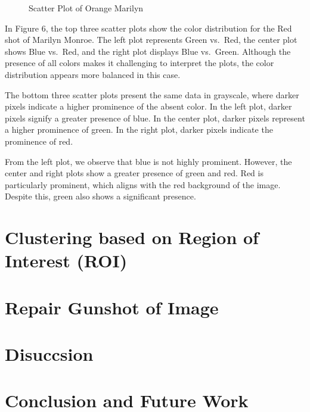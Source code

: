 \documentclass{article}
\begin{document}
\begin{figure}[ht]
  \caption{Scatter Plot of Orange Marilyn}
  \label{fig:orange_marilyn_scatter}
\end{figure}

In Figure 6, the top three scatter plots show the color distribution for
the Red shot of Marilyn Monroe. The left plot represents Green vs.~Red,
the center plot shows Blue vs.~Red, and the right plot displays Blue
vs.~Green. Although the presence of all colors makes it challenging to
interpret the plots, the color distribution appears more balanced in
this case.

The bottom three scatter plots present the same data in grayscale, where
darker pixels indicate a higher prominence of the absent color. In the
left plot, darker pixels signify a greater presence of blue. In the
center plot, darker pixels represent a higher prominence of green. In
the right plot, darker pixels indicate the prominence of red.

From the left plot, we observe that blue is not highly prominent.
However, the center and right plots show a greater presence of green and
red. Red is particularly prominent, which aligns with the red background
of the image. Despite this, green also shows a significant presence.

\hypertarget{clustering-based-on-region-of-interest-roi}{%
\section{Clustering based on Region of Interest
(ROI)}\label{clustering-based-on-region-of-interest-roi}}

\hypertarget{repair-gunshot-of-image}{%
\section{Repair Gunshot of Image}\label{repair-gunshot-of-image}}

\hypertarget{disuccsion}{%
\section{Disuccsion}\label{disuccsion}}

\hypertarget{conclusion-and-future-work}{%
\section{Conclusion and Future Work}\label{conclusion-and-future-work}}



\end{document}
